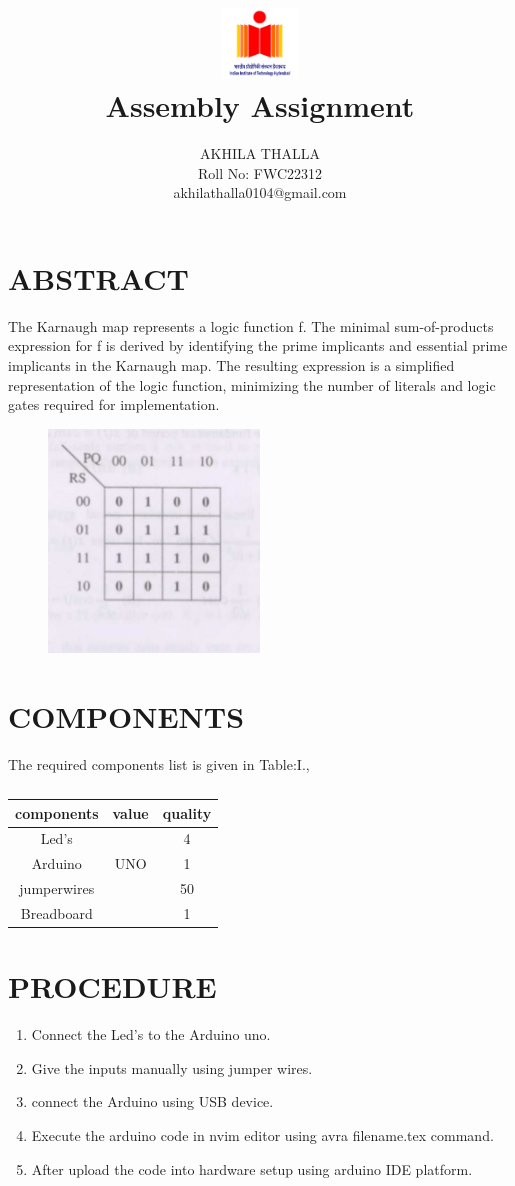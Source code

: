 \documentclass[conference]{IEEEtran}
\title{
\vspace{1cm}
{\includegraphics[width=0.15\textwidth]{1.jpg} \\ Assembly Assignment}}
\author{AKHILA THALLA \\ Roll No: FWC22312 \\ akhilathalla0104@gmail.com}
\begin{document}
\maketitle
\section{ABSTRACT}
The Karnaugh map represents a logic function f. The minimal sum-of-products expression for f is derived by identifying the prime implicants and essential prime implicants in the Karnaugh map. The resulting expression is a simplified representation of the logic function, minimizing the number of literals and logic gates required for implementation.
\begin{figure}[h]
\centering
\includegraphics[width=0.5\textwidth]{2.jpg  }
\caption{\label{fig-1:Gates}}
\end{figure}
\section{COMPONENTS}
 The required components list is given in Table:I.,
 \vspace{0.3cm}
 \begin{table} [htbp]
 \centering
 \begin{tabular}{| c | c | c |} \hline
 components & value & quality \\ \hline
 Led's & & 4 \\ \hline
 Arduino & UNO & 1 \\ \hline
 jumperwires & & 50 \\ \hline
 Breadboard & & 1 \\
 \hline
 \end{tabular}
 \vspace{0.3cm}
 \caption{\label{tab:widgets}}
 \end{table}
 \section{PROCEDURE}
 \begin{enumerate}
 \item Connect the Led's to the Arduino uno.
 \item Give the inputs manually using jumper wires.
 \item connect the Arduino using USB device.
 \item Execute the arduino code in nvim editor using avra filename.tex command.
 \item After upload the code into hardware setup using arduino IDE platform.
 \end{enumerate}
\end{document}
